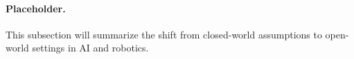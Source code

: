 \paragraph{Placeholder.}
This subsection will summarize the shift from closed-world assumptions to open-world settings in AI and robotics.
